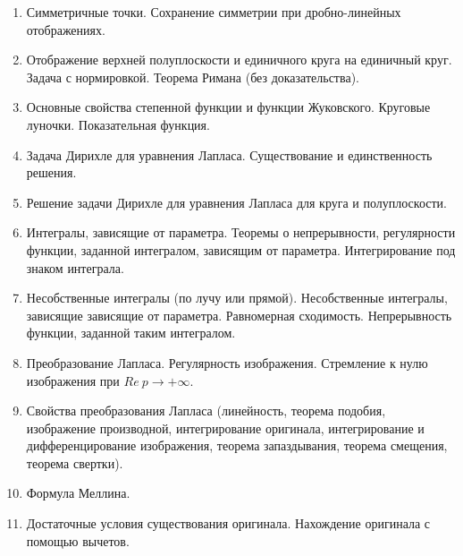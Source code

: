 \documentclass{article}
\begin{document}
\begin{enumerate}
	\item Симметричные точки. Сохранение симметрии при дробно-линейных отображениях.
	\item Отображение верхней полуплоскости и единичного круга на единичный круг. Задача с нормировкой. Теорема Римана (без доказательства).
	\item Основные свойства степенной функции и функции Жуковского. Круговые луночки. Показательная функция.
	\item Задача Дирихле для уравнения Лапласа. Существование и единственность решения.
	\item Решение задачи Дирихле для уравнения Лапласа для круга и полуплоскости.
	\item Интегралы, зависящие от параметра. Теоремы о непрерывности, регулярности функции, заданной интегралом, зависящим от параметра. Интегрирование под знаком интеграла.
	\item Несобственные интегралы (по лучу или прямой). Несобственные интегралы, зависящие зависящие от параметра. Равномерная сходимость. Непрерывность функции, заданной таким интегралом.
	\item Преобразование Лапласа. Регулярность изображения. Стремление к нулю изображения при $Re\ p \rightarrow +\infty$.
	\item Свойства преобразования Лапласа (линейность, теорема подобия, изображение производной, интегрирование оригинала, интегрирование и дифференцирование изображения, теорема запаздывания, теорема
	      смещения, теорема свертки).
	\item Формула Меллина.
	\item Достаточные условия существования оригинала. Нахождение оригинала с помощью вычетов.
\end{enumerate}
\end{document}
